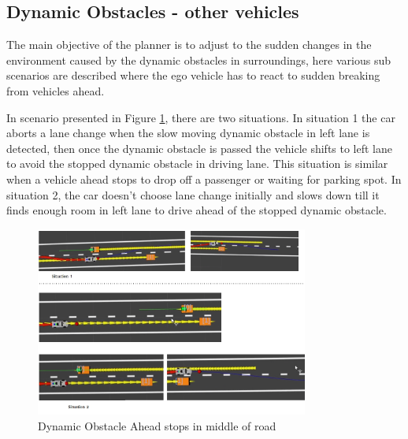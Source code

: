 \subsection{Dynamic Obstacles - other vehicles}
The main objective of the planner is to adjust to the sudden changes in the environment caused by the dynamic obstacles in surroundings, here various sub scenarios are described where the ego vehicle has to react to sudden breaking from vehicles ahead. 

In scenario presented in Figure \ref{dynamic_1}, there are two situations. In situation 1 the car aborts a lane change when the slow moving dynamic obstacle in left lane is detected, then once the dynamic obstacle is passed the vehicle shifts to left lane to avoid the stopped dynamic obstacle in driving lane. This situation is similar when a vehicle ahead stops to drop off a passenger or waiting for parking spot. In situation 2, the car doesn't choose lane change initially and slows down till it finds enough room in left lane to drive ahead of the stopped dynamic obstacle. 

\begin{figure}[H]
    \centering
    \includegraphics[width=0.8\textwidth]{Images/evaluation/dynamic_ahead_breaking1.jpg}
    \caption{Dynamic Obstacle Ahead stops in middle of road}
    \label{dynamic_1}
\end{figure}

